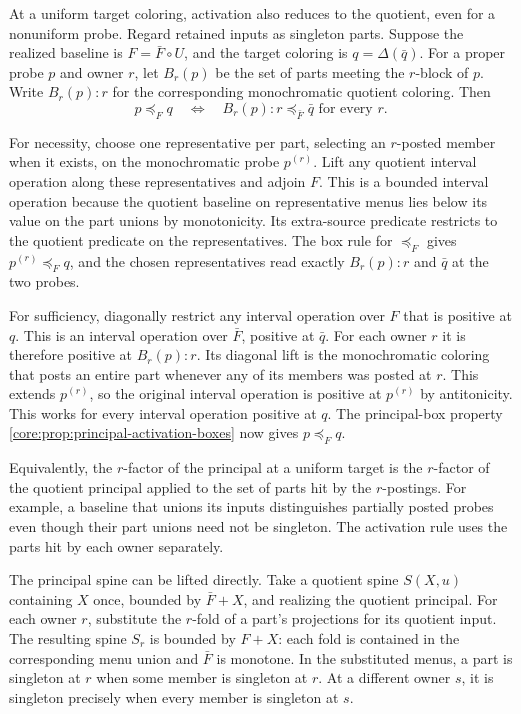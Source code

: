 At a uniform target coloring, activation
also reduces to the quotient, even for
a nonuniform probe. Regard retained inputs
as singleton parts. Suppose the realized
baseline is $F=\bar F\circ U$, and the
target coloring is $q=\Delta(\bar q)$.
For a proper probe $p$ and owner $r$,
let $B_r(p)$ be the set of parts meeting
the $r$-block of $p$. Write $B_r(p):r$
for the corresponding monochromatic
quotient coloring. Then
\[
       p\preceq_F q
       \quad\Longleftrightarrow\quad
       B_r(p):r\preceq_{\bar F}\bar q
       \text{ for every }r.
\]

For necessity, choose one representative
per part, selecting an $r$-posted member
when it exists, on the monochromatic
probe $p^{(r)}$. Lift any quotient interval
operation along these representatives
and adjoin $F$. This is a bounded interval
operation because the quotient baseline
on representative menus lies below its
value on the part unions by monotonicity.
Its extra-source predicate restricts to
the quotient predicate on the representatives.
The box rule for $\preceq_F$ gives
$p^{(r)}\preceq_F q$, and the chosen
representatives read exactly $B_r(p):r$
and $\bar q$ at the two probes.

For sufficiency, diagonally restrict any
interval operation over $F$ that is
positive at $q$. This is an interval
operation over $\bar F$, positive at
$\bar q$. For each owner $r$ it is
therefore positive at $B_r(p):r$.
Its diagonal lift is the monochromatic
coloring that posts an entire part
whenever any of its members was posted
at $r$. This extends $p^{(r)}$, so the
original interval operation is positive
at $p^{(r)}$ by antitonicity. This works
for every interval operation positive
at $q$. The principal-box property
\cref{core:prop:principal-activation-boxes}
now gives $p\preceq_F q$.

Equivalently, the $r$-factor of the
principal at a uniform target is the
$r$-factor of the quotient principal
applied to the set of parts hit by the
$r$-postings. For example, a baseline
that unions its inputs distinguishes
partially posted probes even though
their part unions need not be singleton.
The activation rule uses the parts hit
by each owner separately.

The principal spine can be lifted directly.
Take a quotient spine $S(X,u)$ containing
$X$ once, bounded by $\bar F+X$, and
realizing the quotient principal. For each
owner $r$, substitute the $r$-fold of a
part's projections for its quotient
input. The resulting spine $S_r$ is
bounded by $F+X$: each fold is contained
in the corresponding menu union and
$\bar F$ is monotone. In the substituted
menus, a part is singleton at $r$ when
some member is singleton at $r$. At a
different owner $s$, it is singleton
precisely when every member is singleton
at $s$.

